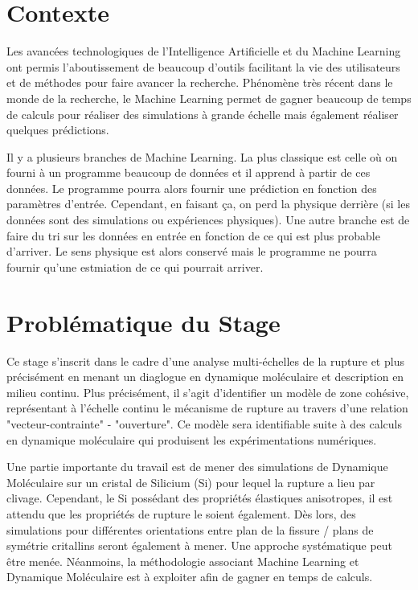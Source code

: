 
\section{Contexte} %

    Les avancées technologiques de l'Intelligence Artificielle et du Machine Learning ont permis l'aboutissement de beaucoup d'outils facilitant la vie des utilisateurs et de méthodes pour faire avancer la recherche. Phénomène très récent dans le monde de la recherche, le Machine Learning permet de gagner beaucoup de temps de calculs pour réaliser des simulations à grande échelle mais également réaliser quelques prédictions. 
    
    Il y a plusieurs branches de Machine Learning. La plus classique est celle où on fourni à un programme beaucoup de données et il apprend à partir de ces données. Le programme pourra alors fournir une prédiction en fonction des paramètres d'entrée. Cependant, en faisant ça, on perd la physique derrière (si les données sont des simulations ou expériences physiques). Une autre branche est de faire du tri sur les données en entrée en fonction de ce qui est plus probable d'arriver. Le sens physique est alors conservé mais le programme ne pourra fournir qu'une estmiation de ce qui pourrait arriver. 

\section{Problématique du Stage}

    Ce stage s'inscrit dans le cadre d'une analyse multi-échelles de la rupture et plus précisément en menant un diaglogue en dynamique moléculaire et description en milieu continu. Plus précisément, il s'agit d'identifier un modèle de zone cohésive, représentant à l'échelle continu le mécanisme de rupture au travers d'une relation "vecteur-contrainte" - "ouverture". Ce modèle sera identifiable suite à des calculs en dynamique moléculaire qui produisent les expérimentations numériques. \medskip

    Une partie importante du travail est de mener des simulations de Dynamique Moléculaire sur un cristal de Silicium (Si) pour lequel la rupture a lieu par clivage. Cependant, le Si possédant des propriétés élastiques anisotropes, il est attendu que les propriétés de rupture le soient également. Dès lors, des simulations pour différentes orientations entre plan de la fissure / plans de symétrie critallins seront également à mener. Une approche systématique peut être menée. Néanmoins, la méthodologie associant Machine Learning et Dynamique Moléculaire est à exploiter afin de gagner en temps de calculs. \medskip
    
